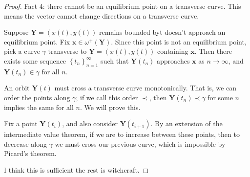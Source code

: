 \begin{proof}
	Fact 4: there cannot be an equilibrium point on a transverse curve. This means the vector cannot change directions on a transverse curve.

	Suppose $\mathbf{Y}=(x(t),y(t))$ remains bounded byt doesn't approach an equilibrium point. Fix $\mathbf{x}\in \omega ^+(\mathbf{Y})$. Since this point is not an equilibrium point, pick a curve $\gamma $ transverse to $\mathbf{Y}=(x(t),y(t))$ containing $\mathbf{x}$. Then there exists some sequence $\left\{ t_n \right\}_{n=1}^\infty$ such that $\mathbf{Y}(t_n)$ approaches $\mathbf{x}$ as $n\to \infty$, and $\mathbf{Y}(t_n)\in \gamma $ for all $n$.

	An orbit $\mathbf{Y}(t)$ must cross a transverse curve monotonically. That is, we can order the points along $\gamma $; if we call this order $\prec$, then $\mathbf{Y}(t_n)\prec \gamma $ for some $n$ implies the same for all $n$. We will prove this.

	Fix a point $\mathbf{Y}(t_i)$, and also consider $\mathbf{Y}(t_{i+1})$. By an extension of the intermediate value theorem, if we are to increase between these points, then to decrease along  $\gamma $ we must cross our previous curve, which is impossible by Picard's theorem.

	I think this is sufficient the rest is witchcraft.
\end{proof}
